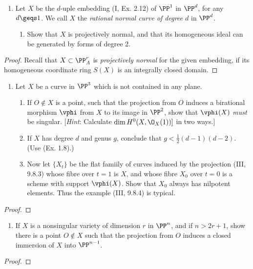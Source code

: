 \documentclass[12pt]{amsart}
\begin{document}
\begin{enumerate}
	\item[4.] {
      Let $X$ be the $d$-uple embedding (I, Ex. 2.12) of $\PP^1$ in $\PP^d$, for any $d\geqs 1$.
      We call $X$ the \emph{rational normal curve of degree $d$} in $\PP^d$.
      \begin{enumerate}
        \item Show that $X$ is projectively normal, and that its homogeneous ideal can be generated by forms of degree 2.
      \end{enumerate}
    }
\end{enumerate}

\begin{proof}
  Recall that $X\subset \PP^r_A$ is \emph{projectively normal} for the given embedding, if its homogeneous coordinate ring $S(X)$ is an integrally closed domain.
\end{proof}

\begin{enumerate}
	\item[5.] {
      Let $X$ be a curve in $\PP^3$ which is not contained in any plane.
      \begin{enumerate}
        \item If $O\notin X$ is a point, such that the projection from $O$ induces a birational morphism $\vphi$ from $X$ to its image in $\PP^2$, show that $\vphi(X)$ \emph{must} be singular.
          [\emph{Hint}: Calculate $\dim H^0(X,\O_X(1))]$ in two ways.]
        \item If $X$ has degree $d$ and genus $g$, conclude that $g<\frac{1}2(d-1)(d-2)$. (Use (Ex. 1.8).)
        \item Now let $\{X_t\}$ be the flat famiily of curves induced by the projection (III, 9.8.3) whose fibre over $t=1$ is $X$, and whose fibre $X_0$ over $t=0$ is a scheme with support $\vphi(X)$.
          Show that $X_0$ always has nilpotent elements.
          Thus the example (III, 9.8.4) is typical.
      \end{enumerate}
    }
\end{enumerate} 

\begin{proof}
\end{proof}

\begin{enumerate}
	\item[11a.] {
      If $X$ is a nonsingular variety of dimension $r$ in $\PP^n$, and if $n>2r+1$, show there is a point $O\notin X$ such that the projection from $O$ induces a closed immersion of $X$ into $\PP^{n-1}$.
    }
\end{enumerate}

\begin{proof}
\end{proof}
\end{document}
